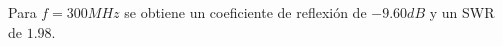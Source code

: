 \documentclass[11pt]{book}
\begin{document}
Para $f=300MHz$ se obtiene un coeficiente de reflexión de $-9.60dB$ y un SWR de $1.98$. 

\begin{figure}[h]
	\centering
	\subfloat[]{
}
\end{figure}
\end{document}

